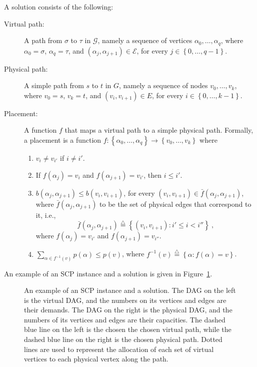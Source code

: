 \documentclass[11pt]{article}
\newcommand{\eqdf}{\stackrel{\scriptscriptstyle \triangle}{=}}
\newcommand{\set}[1]{\left\{ #1 \right\}}
\newcommand{\scp}{\textsc{SCP}\xspace}
\newcommand{\calE}{\mathcal{E}}
\newcommand{\calG}{\mathcal{G}}
\begin{document}
A solution consists of the following:
\begin{description}
\item[Virtual path:] A path from $\sigma$ to $\tau$ in $\calG$, namely
  a sequence of vertices $\alpha_0,\ldots,\alpha_q$, where
  $\alpha_0 = \sigma$, $\alpha_q = \tau$, and
  $(\alpha_j,\alpha_{j+1}) \in \calE$, for every $j \in
  \set{0,\ldots,q-1}$.

\medskip
  
\item[Physical path:] A simple path from $s$ to $t$ in $G$, namely a
  sequence of nodes $v_0,\ldots,v_k$, where $v_0 = s$, $v_k = t$, and
  $(v_i,v_{i+1}) \in E$, for every $i \in \set{0,\ldots,k-1}$.

\medskip
  
\item[Placement:] A function $f$ that maps a virtual path to a simple
  physical path.  Formally, a placement is a function $f:
  \set{\alpha_0,\ldots,\alpha_q} \to \set{v_0,\ldots,v_k}$ where 
\begin{enumerate}
\item $v_i \neq v_{i'}$ if $i \neq i'$.    
\item If $f(\alpha_j) = v_i$ and $f(\alpha_{j+1}) = v_{i'}$, then $i
  \leq i'$.
\item $b(\alpha_j,\alpha_{j+1}) \leq b(v_i,v_{i+1})$, for every
  $(v_i,v_{i+1}) \in \bar{f}(\alpha_j,\alpha_{j+1})$, where
  $\bar{f}(\alpha_j,\alpha_{j+1})$ to be the set of physical edges
  that correspond to it, i.e.,
\[
\bar{f}(\alpha_j,\alpha_{j+1}) \eqdf \set{(v_i,v_{i+1}) : i' \leq i < i''}
~,
\]
  where $f(\alpha_j) = v_{i'}$ and $f(\alpha_{j+1}) = v_{i''}$.

\item $\sum_{\alpha \in f^{-1}(v)} p(\alpha) \leq p(v)$, where
  $f^{-1}(v) \eqdf \set{\alpha : f(\alpha) = v}$.
 
\end{enumerate}
\end{description}

An example of an \scp instance and a solution is given in
Figure~\ref{fig:solution}.

\begin{figure}[t]
\centering
\scalebox{0.9}{

}
\caption{An example of an \scp instance and a solution.
%
The DAG on the left is the virtual DAG, and the numbers on its
vertices and edges are their demands.
%
The DAG on the right is the physical DAG, and the numbers of its
vertices and edges are their capacities.
%
The dashed blue line on the left is the chosen the chosen virtual
path, while the dashed blue line on the right is the chosen physical
path.  Dotted lines are used to represent the allocation of each set
of virtual vertices to each physical vertex along the path.
%
}
\label{fig:solution}
\end{figure}
\end{document}
